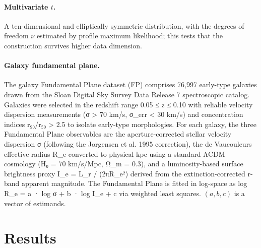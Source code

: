 \documentclass[runningheads]{llncs}
\newcommand{\todo}[1]{\textcolor{red}{[TODO: #1]}}
\begin{document}
\paragraph{Multivariate $t$.} A ten-dimensional and elliptically symmetric distribution, with the degrees of freedom $\nu$ estimated by profile maximum likelihood; this tests that the construction survives higher data dimension. 

\paragraph{Galaxy fundamental plane.} The galaxy Fundamental Plane dataset (FP) comprises 76,997 early-type galaxies drawn from the Sloan Digital Sky Survey Data Release 7 spectroscopic catalog. Galaxies were selected in the redshift range 0.05 ≤ z ≤ 0.10 with reliable velocity dispersion measurements (σ > 70 km/s, σ_err < 30 km/s) and concentration indices r₉₀/r₅₀ > 2.5 to isolate early-type morphologies. For each galaxy, the three Fundamental Plane observables are the aperture-corrected stellar velocity dispersion σ (following the Jorgensen et al. 1995 correction), the de Vaucouleurs effective radius R_e converted to physical kpc using a standard ΛCDM cosmology (H₀ = 70 km/s/Mpc, Ω_m = 0.3), and a luminosity-based surface brightness proxy I_e = L_r / (2πR_e²) derived from the extinction-corrected r-band apparent magnitude. The Fundamental Plane is fitted in log-space as log R_e = a · log σ + b · log I_e + c via weighted least squares. $(a,b,c)$ is a vector of estimands. 




\section{Results}\label{sec:results}
\end{document}
